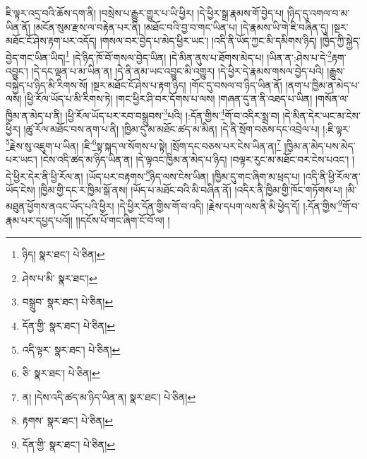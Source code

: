 ཇི་ལྟར་འདྲ་བའི་ཆོས་དག་ནི། །བསྲེས་པ་རྒྱུར་གྱུར་པ་ཡི་ཕྱིར། །དེ་ཕྱིར་སྒྲ་རྣམས་གོ་བྱེད་པ། །ཉིད་དུ་འགལ་བ་མ་ཡིན་ནོ། །མངོན་སུམ་རྫས་ལ་བརྟེན་པར་ནི། །མཐོང་བའི་བྱ་བ་གང་ཡིན་པ། །དེ་རྣམས་ཡི་གེ་ཇི་བཞིན་དུ། །སྔར་མཐོང་ངོ་ཤེས་རྟག་པར་འདོད། །གསལ་བར་བྱེད་པ་མེད་ཕྱིར་ཡང་། །འདི་ནི་ཡོད་ཀྱང་མི་དམིགས་ཉིད། །ཁྱེད་ཀྱི་སྐྱེད་བྱེད་གང་ཡིན་ཡིད།\footnote{ཉིད།  སྣར་ཐང་།  པེ་ཅིན། } །དེ་ཉིད་ཁོ་བོ་གསལ་བྱེད་ཡིན། །དེ་མིན་ནུས་པ་ཐོགས་མེད་པ། །ཡིན་ན་:ཤེས་པ་དེ་\footnote{ཤེས་པ་མི་  སྣར་ཐང་། }རྟག་འབྱུང་། །དེ་དང་ལྡན་པ་མ་ཡིན་ན། །དེ་ནི་ནམ་ཡང་འབྱུང་མི་འགྱུར། །དེ་ཕྱིར་དེ་རྣམས་གསལ་བྱེད་པའི། །རྒྱུས་བསྐྱེད་པ་ཉིད་མི་རིགས་སོ། །སྔར་མཐོང་ངོ་ཤེས་པ་རྟག་ཉིད། །གོང་དུ་བསལ་བ་ཉིད་ཡིན་ནོ། །ནག་པ་ཁྱིམ་ན་མེད་པ་ལས། །ཕྱི་རོལ་ཡོད་པ་མི་རིགས་ཏེ། །གང་ཕྱིར་ཤི་བར་དོགས་པ་ལས། །གཞན་དུ་ན་ནི་འཐད་པ་ཡིན། །གསོན་ལ་ཁྱིམ་ན་མེད་པ་ནི། །ཕྱི་རོལ་ཡོད་པར་རབ་བསྒྲུབས་\footnote{བསྒྲུབ་  སྣར་ཐང་།  པེ་ཅིན། }པའི། །:དོན་གྱིས་\footnote{དོན་གྱི་  སྣར་ཐང་།  པེ་ཅིན། }གོ་བ་འདིར་སྨྲ་བ། །དེ་མིན་དེར་ཡང་མ་ངེས་ཕྱིར། །ཚུ་རོལ་མཐོང་བས་ནག་པ་ནི། །ཁྱིམ་དུ་མ་མཐོང་ཚད་མ་མིན། །དེ་ནི་སྲོག་བཅས་དང་འབྲེལ་པ། །:ཇི་ལྟར་\footnote{འདི་ལྟར་  སྣར་ཐང་།  པེ་ཅིན། }རྗེས་སུ་འཇུག་པ་ཡིན། །ཇི་\footnote{ཅི་  སྣར་ཐང་།  པེ་ཅིན། }སྟ་སྐད་ལ་སོགས་པ་སྟེ། །སྲོག་དང་བཅས་པར་ངེས་ཡིན་ན།\footnote{ན། །དེས་འདི་ཚད་མ་ཉིད་ཡིན་ན།  སྣར་ཐང་།  པེ་ཅིན། } །ཁྱིམ་ན་མེད་པས་མེད་པར་ཡང་། །ངེས་འདི་ཚད་མ་ཉིད་ཡིན་ན། །དེ་ལྟའང་ཁྱིམ་ན་མེད་པ་ཉིད། །བལྟར་རུང་མ་མཐོང་བར་ངེས་པའང་། །དེ་ཕྱིར་དེར་ནི་ཕྱི་རོལ་ན། །ཡོད་པར་བརྟགས་\footnote{རྟགས་  སྣར་ཐང་།  པེ་ཅིན། }ཉིད་ལས་ངེས་ཡིན། །ཁྱིམ་དུ་གང་ཞིག་མ་ཕྲད་པ། །འདི་ནི་ཕྱི་རོལ་ན་ཡོད་ངེས། །ཁྱིམ་གྱི་དང་ར་ཁྱིམ་སྒོ་ནས། །ཡོད་པ་མཐོང་བའི་མི་བཞིན་ནོ། །འདིར་ནི་ཁྱིམ་གྱི་ཁོང་གཏོགས་པ། །མི་མཐུན་ཕྱོགས་ནའང་ཡོད་པའི་ཕྱིར། །དེ་ཕྱིར་དོན་གྱིས་གོ་བ་འདི། །རྗེས་དཔག་ལས་ནི་མི་ཕྱེད་དོ། །:དོན་གྱིས་\footnote{དོན་གྱི་  སྣར་ཐང་།  པེ་ཅིན། }གོ་བ་རྣམ་པར་དཔྱད་པའོ།། །།དངོས་པོ་གང་ཞིག་ངོ་བོ་ལ། །
